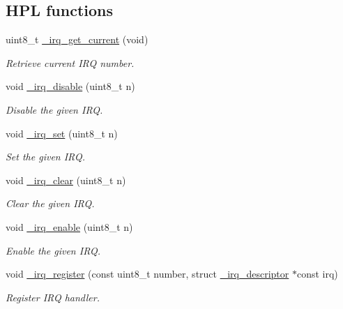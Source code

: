 \subsection*{H\+PL functions}
\begin{DoxyCompactItemize}
\item 
uint8\+\_\+t \hyperlink{group___h_p_l_ga082e8d19d78ab2cf2f63ded8530c7852}{\+\_\+irq\+\_\+get\+\_\+current} (void)
\begin{DoxyCompactList}\small\item\em Retrieve current I\+RQ number. \end{DoxyCompactList}\item 
void \hyperlink{group___h_p_l_gae6a80cff8a450795dc3f2d6df1a19464}{\+\_\+irq\+\_\+disable} (uint8\+\_\+t n)
\begin{DoxyCompactList}\small\item\em Disable the given I\+RQ. \end{DoxyCompactList}\item 
void \hyperlink{group___h_p_l_ga7720726f19dfdda1561a042483c97a58}{\+\_\+irq\+\_\+set} (uint8\+\_\+t n)
\begin{DoxyCompactList}\small\item\em Set the given I\+RQ. \end{DoxyCompactList}\item 
void \hyperlink{group___h_p_l_ga80f1b1a044a8773e23b38517296620b4}{\+\_\+irq\+\_\+clear} (uint8\+\_\+t n)
\begin{DoxyCompactList}\small\item\em Clear the given I\+RQ. \end{DoxyCompactList}\item 
void \hyperlink{group___h_p_l_gac8b7aa49ad81aecd34603b4dc23dd143}{\+\_\+irq\+\_\+enable} (uint8\+\_\+t n)
\begin{DoxyCompactList}\small\item\em Enable the given I\+RQ. \end{DoxyCompactList}\item 
void \hyperlink{group___h_p_l_ga1ee85f2f8227e335c654b9085e9b7d5c}{\+\_\+irq\+\_\+register} (const uint8\+\_\+t number, struct \hyperlink{struct__irq__descriptor}{\+\_\+irq\+\_\+descriptor} $\ast$const irq)
\begin{DoxyCompactList}\small\item\em Register I\+RQ handler. \end{DoxyCompactList}\end{DoxyCompactItemize}
